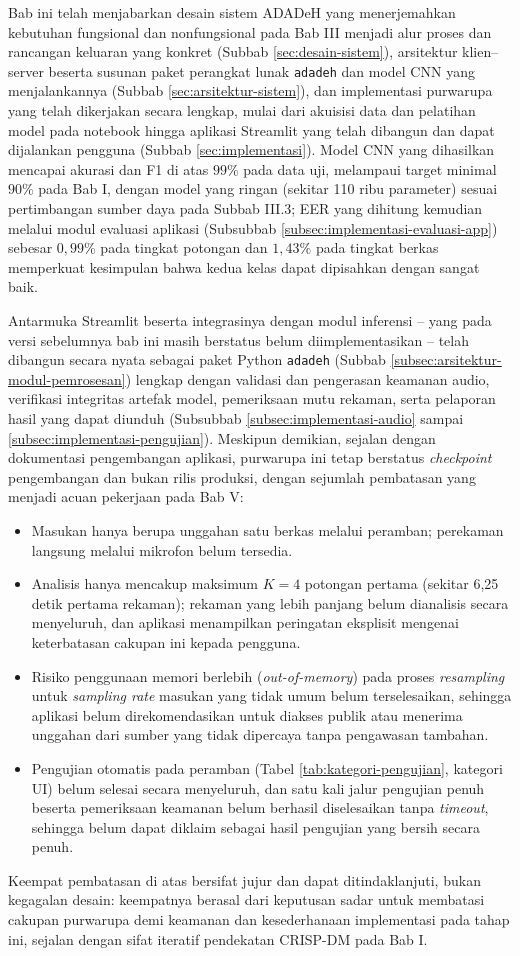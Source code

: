 Bab ini telah menjabarkan desain sistem ADADeH yang menerjemahkan kebutuhan
fungsional dan nonfungsional pada Bab III menjadi alur proses dan rancangan
keluaran yang konkret (Subbab \ref{sec:desain-sistem}), arsitektur klien--server
beserta susunan paket perangkat lunak \texttt{adadeh} dan model CNN yang
menjalankannya (Subbab \ref{sec:arsitektur-sistem}), dan implementasi purwarupa
yang telah dikerjakan secara lengkap, mulai dari akuisisi data dan pelatihan
model pada notebook hingga aplikasi Streamlit yang telah dibangun dan dapat
dijalankan pengguna (Subbab \ref{sec:implementasi}). Model CNN yang dihasilkan
mencapai akurasi dan F1 di atas $99\%$ pada data uji, melampaui target minimal
$90\%$ pada Bab I, dengan model yang ringan (sekitar 110 ribu parameter) sesuai
pertimbangan sumber daya pada Subbab III.3; EER yang dihitung kemudian melalui
modul evaluasi aplikasi (Subsubbab \ref{subsec:implementasi-evaluasi-app})
sebesar $0{,}99\%$ pada tingkat potongan dan $1{,}43\%$ pada tingkat berkas
memperkuat kesimpulan bahwa kedua kelas dapat dipisahkan dengan sangat baik.

Antarmuka Streamlit beserta integrasinya dengan modul inferensi -- yang pada
versi sebelumnya bab ini masih berstatus belum diimplementasikan -- telah
dibangun secara nyata sebagai paket Python \texttt{adadeh} (Subbab
\ref{subsec:arsitektur-modul-pemrosesan}) lengkap dengan validasi dan pengerasan
keamanan audio, verifikasi integritas artefak model, pemeriksaan mutu rekaman,
serta pelaporan hasil yang dapat diunduh (Subsubbab
\ref{subsec:implementasi-audio} sampai \ref{subsec:implementasi-pengujian}).
Meskipun demikian, sejalan dengan dokumentasi pengembangan aplikasi, purwarupa
ini tetap berstatus \textit{checkpoint} pengembangan dan bukan rilis produksi,
dengan sejumlah pembatasan yang menjadi acuan pekerjaan pada Bab V:

\begin{itemize}
  \item Masukan hanya berupa unggahan satu berkas melalui peramban; perekaman
  langsung melalui mikrofon belum tersedia.
  \item Analisis hanya mencakup maksimum $K{=}4$ potongan pertama (sekitar
  6,25 detik pertama rekaman); rekaman yang lebih panjang belum dianalisis
  secara menyeluruh, dan aplikasi menampilkan peringatan eksplisit mengenai
  keterbatasan cakupan ini kepada pengguna.
  \item Risiko penggunaan memori berlebih (\textit{out-of-memory}) pada proses
  \textit{resampling} untuk \textit{sampling rate} masukan yang tidak umum
  belum terselesaikan, sehingga aplikasi belum direkomendasikan untuk diakses
  publik atau menerima unggahan dari sumber yang tidak dipercaya tanpa
  pengawasan tambahan.
  \item Pengujian otomatis pada peramban (Tabel \ref{tab:kategori-pengujian},
  kategori UI) belum selesai secara menyeluruh, dan satu kali jalur pengujian
  penuh beserta pemeriksaan keamanan belum berhasil diselesaikan tanpa
  \textit{timeout}, sehingga belum dapat diklaim sebagai hasil pengujian yang
  bersih secara penuh.
\end{itemize}

Keempat pembatasan di atas bersifat jujur dan dapat ditindaklanjuti, bukan
kegagalan desain: keempatnya berasal dari keputusan sadar untuk membatasi
cakupan purwarupa demi keamanan dan kesederhanaan implementasi pada tahap ini,
sejalan dengan sifat iteratif pendekatan CRISP-DM pada Bab I.